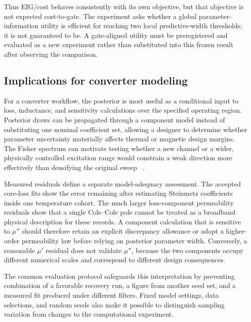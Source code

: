 Thus EIG/cost behaves consistently with its own objective, but that
objective is not expected cost-to-gate. The experiment asks whether a
global parameter- information utility is efficient for reaching two
local predictive-width thresholds; it is not guaranteed to be. A
gate-aligned utility must be preregistered and evaluated as a new
experiment rather than substituted into this frozen result after
observing the comparison.

\hypertarget{implications-for-converter-modeling}{%
\subsection{Implications for converter
modeling}\label{implications-for-converter-modeling}}

For a converter workflow, the posterior is most useful as a conditional
input to loss, inductance, and sensitivity calculations over the
specified operating region. Posterior draws can be propagated through a
component model instead of substituting one nominal coefficient set,
allowing a designer to determine whether parameter uncertainty
materially affects thermal or magnetic design margins. The Fisher
spectrum can motivate testing whether a new channel or a wider,
physically controlled excitation range would constrain a weak direction
more effectively than densifying the original sweep
~\citep{chaloner1995, atkinson2007}.

Measured residuals define a separate model-adequacy assessment. The
accepted core-loss fits show the error remaining after estimating
Steinmetz coefficients inside one temperature cohort. The much larger
loss-component permeability residuals show that a single Cole--Cole pole
cannot be treated as a broadband physical description for these records.
A component calculation that is sensitive to \(\mu''\) should therefore
retain an explicit discrepancy allowance or adopt a higher-order
permeability law before relying on posterior parameter width.
Conversely, a reasonable \(\mu'\) residual does not validate \(\mu''\),
because the two components occupy different numerical scales and
correspond to different design consequences.

The common evaluation protocol safeguards this interpretation by
preventing combination of a favorable recovery run, a figure from
another seed set, and a measured fit produced under different filters.
Fixed model settings, data selections, and random seeds also make it
possible to distinguish sampling variation from changes to the
computational experiment.

